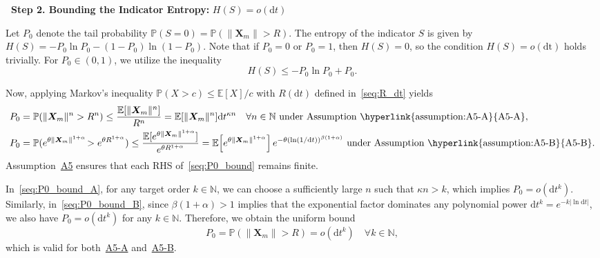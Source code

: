 \documentclass[
 longbibliography,
 twocolumn,
 superscriptaddress,
 amsmath,
 amssymb,
 amsthm,
 amsfonts,
 prl,
 floatfix,
]{revtex4-2}
\begin{document}
\begin{widetext}
\bigskip
\noindent\textbf{\textbullet\ Step 2. Bounding the Indicator Entropy:} $H(S)=o(\mathrm dt)$

Let $P_0$ denote the tail probability $\mathbb{P}(S=0) = \mathbb{P}(\|\bm{X}_m\| > R)$. The entropy of the indicator $S$ is given by $H(S) = -P_0\ln P_0 - (1-P_0)\ln(1-P_0)$. Note that if $P_0=0$ or $P_0=1$, then $H(S)=0$, so the condition $H(S)=o(\mathrm{dt})$ holds trivially. For $P_0 \in (0,1)$, we utilize the inequality
\begin{equation}
    H(S) \leq -P_0\ln P_0 + P_0.
    \label{seq:H(S)_bound}
\end{equation}

Now, applying Markov's inequality $\mathbb P(X>c)\leq\mathbb E[X]/c$ with $R(\mathrm dt)$ defined in~\eqref{seq:R_dt} yields
\begin{subequations}\label{seq:P0_bound}
\renewcommand{\theequation}{\theparentequation-\Alph{equation}}
\begin{align}
    P_0&=\mathbb P(\|\bm X_m\|^n>R^n)
    \leq\frac{\mathbb E[\|\bm X_m\|^n]}{R^n}
    =\mathbb E[\|\bm X_m\|^n]\mathrm dt^{\kappa n}
    \quad\forall n\in\mathbb N
    \text{ under Assumption~\hyperlink{assumption:A5-A}{A5-A}},
    \label{seq:P0_bound_A}
    \\
    P_0&=\mathbb P(e^{\theta\|\bm X_m\|^{1+\alpha}}\!>e^{\theta R^{1+\alpha}})
    \leq\frac{\mathbb E[e^{\theta\|\bm X_m\|^{1+\alpha}}]}{e^{\theta R^{1+\alpha}}}
    =\mathbb E\!\left[e^{\theta\|\bm X_m\|^{1+\alpha}}\right]
    e^{-\theta(\ln(1/\mathrm dt))^{\beta(1+\alpha)}}
    \text{ under Assumption~\hyperlink{assumption:A5-B}{A5-B}}.
    \label{seq:P0_bound_B}
\end{align}
\end{subequations}
Assumption~\hyperlink{assumption:A5}{A5} ensures that each RHS of~\eqref{seq:P0_bound} remains finite.

In~\eqref{seq:P0_bound_A}, for any target order $k\in\mathbb N$, we can choose a sufficiently large $n$ such that $\kappa n > k$, which implies $P_0=o(\mathrm dt^k)$. %
Similarly, in~\eqref{seq:P0_bound_B}, since $\beta(1+\alpha)>1$ implies that the exponential factor dominates any polynomial power $\mathrm dt^k=e^{-k|\ln\mathrm dt|}$, we also have $P_0=o(\mathrm dt^k)$ for any $k\in\mathbb N$.
Therefore, we obtain the uniform bound
\begin{equation}
    P_0=\mathbb P(\|\bm X_m\|>R)=o(\mathrm dt^k)
    \quad\forall k\in\mathbb N,
    \label{seq:P0_bound_uniform}
\end{equation}
which is valid for both~\hyperlink{assumption:A5-A}{A5-A} and~\hyperlink{assumption A5-B}{A5-B}.


\end{widetext}
\end{document}
